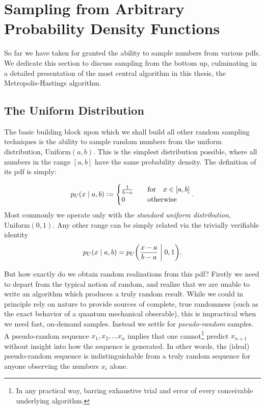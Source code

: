 \documentclass[Thesis.tex]{subfiles}
\begin{document}
\section{Sampling from Arbitrary Probability Density Functions}
\label{sec:sampling-arb-prob-dist-funcs}

So far we have taken for granted the ability to sample numbers from various
\glspl{pdf}. We dedicate this section to discuss sampling from the bottom up,
culminating in a detailed presentation of the most central algorithm in this
thesis, the Metropolis-Hastings algorithm.

\subsection{The Uniform Distribution}

The basic building block upon which we shall build all other random sampling
techniques is the ability to sample random numbers from the uniform
distribution, $\text{Uniform}(a, b)$. This is the simplest distribution
possible, where all numbers in the range $[a, b]$ have the same probability
density. The definition of its \gls{pdf} is simply:

\begin{align}\label{eq:uniform-pdf-definition}
    p_U\qty(x\;\middle|\; a, b) \defeq  \begin{cases}
        \frac{1}{b - a} &\qfor x\in [a, b]\\
        0&\qotherwise
    \end{cases}.
\end{align}
Most commonly we operate only with the \emph{standard uniform distribution}, $\text{Uniform}(0, 1)$. Any other range can be simply related via the trivially verifiable identity
\begin{align}
    p_U\qty(x\;\middle|\; a,b) = p_U\qty( \frac{x-a}{b-a} \;\middle|\; 0, 1).
\end{align}

But how exactly do we obtain random realizations from this \gls{pdf}? Firstly we need
to depart from the typical notion of random, and realize that we are unable to
write an algorithm which produces a truly random result. While we could in
principle rely on nature to provide sources of complete, true randomness (such as
the exact behavior of a quantum mechanical obserable), this is impractical
when we need fast, on-demand samples. Instead we settle for
\emph{pseudo-random} samples. A pseudo-random sequence $x_1, x_2,\dots x_n$
implies that one cannot\footnote{In any practical way, barring exhaustive trial
and error of every conceivable underlying algorithm.} predict $x_{n+1}$ without
insight into how the sequence is generated. In other words, the (ideal)
pseudo-random sequence is indistinguishable from a truly random sequence for
anyone observing the numbers $x_i$ alone.
\end{document}
